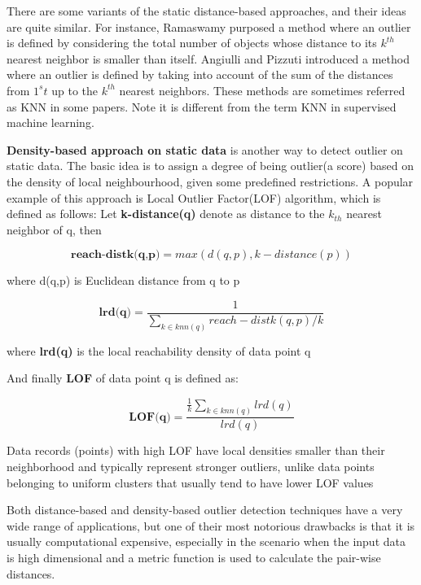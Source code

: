 \documentclass[11pt]{article}       %
\begin{document}
There are some variants of the static distance-based approaches, and their ideas are quite similar. For instance, Ramaswamy\cite{Ramaswamy:2000:EAM:342009.335437} purposed a method where an outlier is defined by considering the total number of objects whose distance to its $k^{th}$ nearest neighbor is smaller than itself. Angiulli and Pizzuti\cite{1377172} introduced a method where an outlier is defined by taking into account of the sum of the distances from $1^st$ up to the $k^{th}$ nearest neighbors. These methods are sometimes referred as KNN in some papers. Note it is different from the term KNN in supervised machine learning. 

\textbf{Density-based approach on static data} is another way to detect outlier on static data. The basic idea is to assign a degree of being outlier(a score) based on the density of local neighbourhood, given some predefined restrictions. A popular example of this approach is Local Outlier Factor(LOF) algorithm\cite{Breunig:2000:LID:342009.335388}, which is defined as follows: Let \textbf{k-distance(q)} denote as distance to the $k_{th}$ nearest neighbor of q, then

\begin{equation}
\textbf{reach-distk(q,p)} = max(d(q,p), k-distance(p))
\end{equation}

where d(q,p) is Euclidean distance from q to p  

\begin{equation}
\textbf{lrd(q)} =  \frac{1}{\sum\limits_{k \in knn(q)} reach-distk(q,p) / k}
\end{equation}

where \textbf{lrd(q)} is the local reachability density of data point q

And finally \textbf{LOF} of data point q is defined as:

\begin{equation}
\textbf{LOF(q)} = \frac{\frac{1}{k} \sum_{k \in knn(q)} lrd(q)}{lrd(q)}
\end{equation}

Data records (points) with high LOF have local densities smaller than their neighborhood and typically represent stronger outliers, unlike data points belonging to uniform clusters that usually tend to have lower LOF values\cite{4221341}

Both distance-based and density-based outlier detection techniques have a very wide range of applications, but one of their most notorious drawbacks is that it is usually computational expensive, especially in the scenario when the input data is high dimensional and a metric function is used to calculate the pair-wise distances.  
\end{document}
